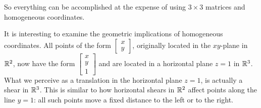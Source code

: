 \documentclass{ximera}
\begin{document}
So everything can be accomplished at the expense of using $3 \times 3$ matrices and homogeneous coordinates.
    
It is interesting to examine the geometric implications of homogeneous coordinates.  All points of the form $\begin{bmatrix}x\\y\end{bmatrix}$, originally located in the $xy$-plane in $\mathbb{R}^2$, now have the form $\begin{bmatrix}x\\y\\1\end{bmatrix}$ and are located in a horizontal plane $z=1$ in $\mathbb{R}^3$.  What we perceive as a translation in the horizontal plane $z=1$, is actually a shear in $\mathbb{R}^3$.  This is similar to how horizontal shears in $\mathbb{R}^2$ affect points along the line $y=1$: all such points move a fixed distance to the left or to the right.
    
\end{document}
